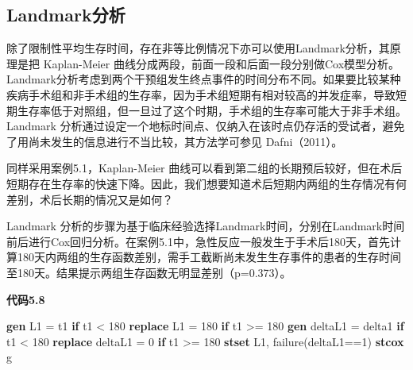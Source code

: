 \documentclass[
  chinese-hans,
  letterpaper,
  DIV=11,
  numbers=noendperiod]{scrreprt}
\newenvironment{Shaded}{\begin{snugshade}}{\end{snugshade}}
\newcommand{\KeywordTok}[1]{\textcolor[rgb]{0.00,0.23,0.31}{\textbf{#1}}}
\newcommand{\NormalTok}[1]{\textcolor[rgb]{0.00,0.23,0.31}{#1}}
\begin{document}
\subsection{Landmark分析}\label{landmarkux5206ux6790}

除了限制性平均生存时间，存在非等比例情况下亦可以使用Landmark分析，其原理是把
Kaplan-Meier
曲线分成两段，前面一段和后面一段分别做Cox模型分析。Landmark分析考虑到两个干预组发生终点事件的时间分布不同。如果要比较某种疾病手术组和非手术组的生存率，因为手术组短期有相对较高的并发症率，导致短期生存率低于对照组，但一旦过了这个时期，手术组的生存率可能大于非手术组。Landmark
分析通过设定一个地标时间点、仅纳入在该时点仍存活的受试者，避免了用尚未发生的信息进行不当比较，其方法学可参见
Dafni（2011）。

同样采用案例5.1，Kaplan-Meier
曲线可以看到第二组的长期预后较好，但在术后短期存在生存率的快速下降。因此，我们想要知道术后短期内两组的生存情况有何差别，术后长期的情况又是如何？

Landmark
分析的步骤为基于临床经验选择Landmark时间，分别在Landmark时间前后进行Cox回归分析。在案例5.1中，急性反应一般发生于手术后180天，首先计算180天内两组的生存函数差别，需手工截断尚未发生生存事件的患者的生存时间至180天。结果提示两组生存函数无明显差别（p=0.373）。

\begin{tcolorbox}[enhanced jigsaw, arc=.35mm, bottomrule=.15mm, breakable, colback=white, colframe=quarto-callout-note-color-frame, left=2mm, leftrule=.75mm, opacityback=0, rightrule=.15mm, toprule=.15mm]

\vspace{-3mm}\textbf{代码5.8}\vspace{3mm}

\begin{Shaded}
\begin{Highlighting}[]
\KeywordTok{gen}\NormalTok{ L1 = t1 }\KeywordTok{if}\NormalTok{ t1 \textless{} 180}
\KeywordTok{replace}\NormalTok{ L1 = 180 }\KeywordTok{if}\NormalTok{ t1 \textgreater{}= 180}
\KeywordTok{gen}\NormalTok{ deltaL1 = delta1 }\KeywordTok{if}\NormalTok{ t1 \textless{} 180}
\KeywordTok{replace}\NormalTok{ deltaL1 = 0 }\KeywordTok{if}\NormalTok{ t1 \textgreater{}= 180}
\KeywordTok{stset}\NormalTok{ L1, failure(deltaL1==1)}
\KeywordTok{stcox}\NormalTok{ g}
\end{Highlighting}
\end{Shaded}

\end{tcolorbox}
\end{document}
